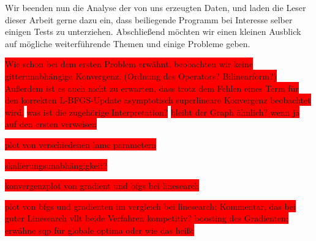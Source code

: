 Wir beenden nun die Analyse der von uns erzeugten Daten, und laden die Leser dieser Arbeit gerne dazu ein, dass beiliegende Programm bei Interesse selber einigen Tests zu unterziehen. Abschließend möchten wir einen kleinen Ausblick auf mögliche weiterführende Themen und einige Probleme geben.

\colorbox{red}{Wie schon bei dem ersten Problem erwähnt, beobachten wir keine gitterunabhängige Konvergenz. (Ordnung des Operators? Bilinearform?)}
\colorbox{red}{Außerdem ist es auch nicht zu erwarten, dass trotz dem Fehlen eines Term für den korrekten L-BFGS-Update asymptotisch superlineare Konvergenz beobachtet wird.}
\colorbox{red}{was ist die zugehörige Interpretation?} 
\colorbox{red}{bleibt der Graph ähnlich? wenn ja auf den ersten verweisen}



\colorbox{red}{plot von verschiedenen lame parametern}

\colorbox{red}{skalierungsunabhängigkeit?}

\colorbox{red}{konvergenzplot von gradient und bfgs bei linesearch}

\colorbox{red}{plot von bfgs und gradienten im vergleich bei linesearch; Kommentar, das bei guter Linesearch vllt beide Verfahren kompetitiv? boosting des Gradienten; erwähne  sqp für globale optima oder wie das heißt}


